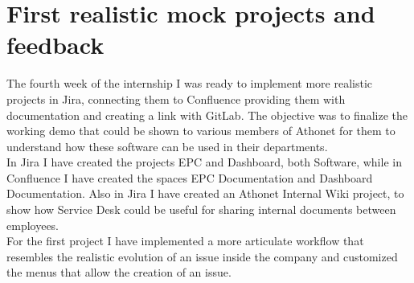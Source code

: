 \section{First realistic mock projects and feedback}
	The fourth week of the internship I was ready to implement more realistic projects in Jira, connecting them to Confluence providing them with documentation and creating a link with GitLab.
	The objective was to finalize the working demo that could be shown to various members of Athonet for them to understand how these software can be used in their departments.\\
	In Jira I have created the projects EPC and Dashboard, both Software, while in Confluence I have created the spaces EPC Documentation and Dashboard Documentation.
	Also in Jira I have created an Athonet Internal Wiki project, to show how Service Desk could be useful for sharing internal documents between employees.\\
	For the first project I have implemented a more articulate workflow that resembles the realistic evolution of an issue inside the company and customized the menus that allow the creation of an issue.
	
	
